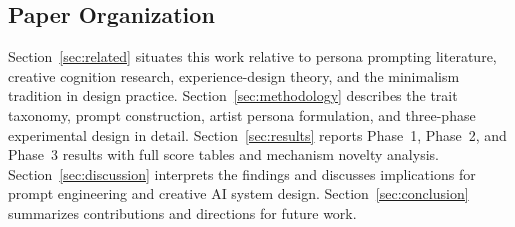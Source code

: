 \subsection{Paper Organization}

Section~\ref{sec:related} situates this work relative to persona prompting literature, creative cognition research, experience-design theory, and the minimalism tradition in design practice. Section~\ref{sec:methodology} describes the trait taxonomy, prompt construction, artist persona formulation, and three-phase experimental design in detail. Section~\ref{sec:results} reports Phase~1, Phase~2, and Phase~3 results with full score tables and mechanism novelty analysis. Section~\ref{sec:discussion} interprets the findings and discusses implications for prompt engineering and creative AI system design. Section~\ref{sec:conclusion} summarizes contributions and directions for future work.

